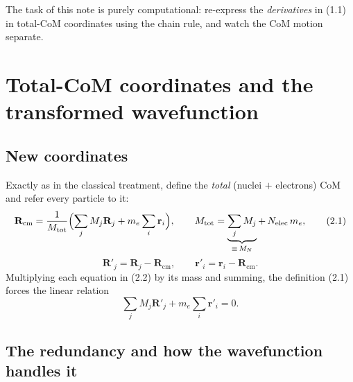 \documentclass{article}
\begin{document}
The task of this note is purely computational: re-express the \emph{derivatives} in (1.1) in total-CoM coordinates using the chain rule, and watch the CoM motion separate.

\section{Total-CoM coordinates and the transformed wavefunction}

\subsection{New coordinates}

Exactly as in the classical treatment, define the \emph{total} (nuclei $+$ electrons) CoM and refer every particle to it:
\begin{equation}
\mathbf{R}_{\mathrm{cm}} = \frac{1}{M_{\mathrm{tot}}}\Bigl(\sum_j M_j\mathbf{R}_j + m_e\sum_i\mathbf{r}_i\Bigr),\qquad M_{\mathrm{tot}} = \underbrace{\sum_j M_j}_{\equiv\,M_N} +\, N_{\mathrm{elec}}\,m_e, \tag{2.1}
\end{equation}
\begin{equation}
\mathbf{R}'_j = \mathbf{R}_j - \mathbf{R}_{\mathrm{cm}},\qquad \mathbf{r}'_i = \mathbf{r}_i - \mathbf{R}_{\mathrm{cm}}. \tag{2.2}
\end{equation}
Multiplying each equation in (2.2) by its mass and summing, the definition (2.1) forces the linear relation
\begin{equation}
\sum_j M_j\mathbf{R}'_j + m_e\sum_i\mathbf{r}'_i = 0. \tag{2.3}
\end{equation}

\subsection{The redundancy and how the wavefunction handles it}
\end{document}
